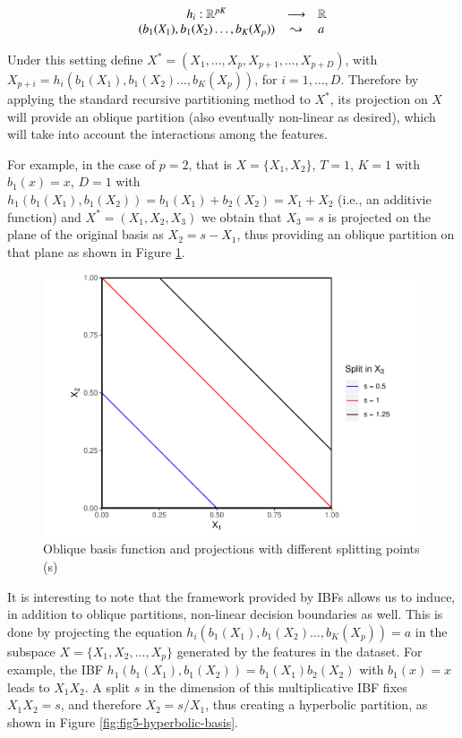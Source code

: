 \documentclass[]{elsarticle} %
\makeatletter
\def\maxwidth{\ifdim\Gin@nat@width>\linewidth\linewidth
\else\Gin@nat@width\fi}
\let\Oldincludegraphics\includegraphics
\renewcommand{\includegraphics}[1]{\Oldincludegraphics[width=\maxwidth]{#1}}
\makeatother
\begin{document}
\[
\begin{array}{ccl}h_{i}:\mathbb{R}^{pK}&\longrightarrow&\mathbb{R}\\{\tiny (b_1(X_1),b_1(X_2)\dots, b_K(X_p))}&\leadsto &a\end{array}
\]

Under this setting define
\(X^{\ast }=\left( X_{1},\dots,X_{p},X_{p+1},\dots ,X_{p+D} \right)\),
with \(X_{p+i}=h_i(b_1(X_1),b_1(X_2)\dots, b_K(X_p))\), for
\(i=1,\dots ,D\). Therefore by applying the standard recursive
partitioning method to \(X^\ast\), its projection on \(X\) will provide
an oblique partition (also eventually non-linear as desired), which will
take into account the interactions among the features.

For example, in the case of \(p=2\), that is \(X=\{X_1,X_2\}\), \(T=1\),
\(K=1\) with \(b_1(x)=x\), \(D=1\) with
\(h_1(b_1(X_1),b_1(X_2))=b_1(X_1)+b_2(X_2)=X_1+X_2\) (i.e., an additivie
function) and \(X^{\ast }=\left( X_{1},X_{2},X_{3} \right)\) we obtain
that \(X_3=s\) is projected on the plane of the original basis as
\(X_2=s-X_1\), thus providing an oblique partition on that plane as
shown in Figure \ref{fig:fig4-additive-basis}.

\begin{figure}
\centering
\includegraphics{Trees_with_Base_Functions_v3_files/figure-latex/fig4-additive-basis-1.pdf}
\caption{\label{fig:fig4-additive-basis}Oblique basis function and
projections with different splitting points (s)}
\end{figure}

It is interesting to note that the framework provided by IBFs allows us
to induce, in addition to oblique partitions, non-linear decision
boundaries as well. This is done by projecting the equation
\(h_i(b_1(X_1),b_1(X_2)\dots, b_K(X_p))=a\) in the subspace
\(X=\{X_1, X_2,\dots, X_p\}\) generated by the features in the dataset.
For example, the IBF \(h_1(b_1(X_1),b_1(X_2))=b_1(X_1)b_2(X_2)\) with
\(b_1(x)=x\) leads to \(X_1X_2\). A split \(s\) in the dimension of this
multiplicative IBF fixes \(X_1X_2=s\), and therefore \(X_2=s/X_1\), thus
creating a hyperbolic partition, as shown in Figure
\ref{fig:fig5-hyperbolic-basis}.
\end{document}
